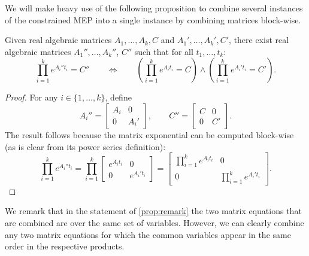 

We will make heavy use of the following proposition to combine several
instances of the constrained MEP into a single instance by combining
matrices block-wise.
\begin{proposition}\label{prop:remark}
  Given real algebraic matrices $A_1,\ldots,A_k,C$ and
  $A_1',\ldots,A_k',C'$, there exist real algebraic matrices
  $A_1'',\ldots,A_k''$, $C''$ such that for all $t_1,\ldots,t_k$:
  \[\prod_{i=1}^{k} e^{A_{i}''t_{i}}=C''\qquad\Leftrightarrow\qquad\left(\prod_{i=1}^{k} e^{A_{i} t_{i}}=C\right)\wedge\left(\prod_{i=1}^{k} e^{A_i't_{i}}=C'\right).\]
\label{prop:combine}
\end{proposition}

\begin{proof}
For any $i\in \lbrace 1,\ldots,k \rbrace$, define
\[A_i''=\begin{bmatrix}A_i&0\\0&A_i'\end{bmatrix},\qquad
C''=\begin{bmatrix}C&0\\0&C'\end{bmatrix}.\]
The result follows because the matrix exponential can be computed
block-wise (as is clear from its power series definition):
\[\prod_{i=1}^{k} e^{A_i''t_{i}}=\prod_{i=1}^{k}\begin{bmatrix}e^{A_{i} t_{i}}&0\\0&e^{A_i't_{i}}\end{bmatrix}=
\begin{bmatrix}\prod_{i=1}^{k} e^{A_{i} t_{i}}&0\\0&\prod_{i=1}^{k} e^{A_i't_{i}}\end{bmatrix}.\]
\end{proof}

We remark that in the statement of \cref{prop:remark} the
two matrix equations that are combined are over the same set of
variables.  However, we can clearly combine any two matrix equations
for which the common variables appear in the same order in the
respective products.

